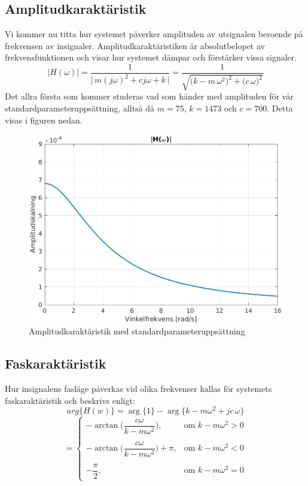 \subsection{Amplitudkaraktäristik}
Vi kommer nu titta hur systemet påverker amplituden av utsignalen beroende på frekvensen av insignaler. Amplitudkaraktäristiken är absolutbelopet av frekvensfunktionen och visar hur systemet dämpar och förstärker vissa signaler. 
$$\big|H(\omega)\big|=\dfrac{1}{\big|\,m(j\omega)^2+cj\omega+k\,\big|}=\dfrac{1}{\sqrt{\big(k-m\,\omega^2\big)^2+\big(c\,\omega\big)^2}}$$
Det allra första som kommer studeras vad som händer med amplituden för vår standardparameteruppsättning, alltså då $m=75$, $k=1473$ och $c=700$. Detta visas i figuren nedan.
\begin{figure}[H]
    \centering
    \includegraphics[scale=0.9]{bilder/amplitudkaraktaristik}
    \caption{Amplitudkaraktäristik med standardparameteruppsättning}
    \label{fig:amplitudkaraktaristik}
\end{figure}



\subsection{Faskaraktäristik}
Hur insignalens fasläge påverkas vid olika frekvenser kallas för systemets faskaraktäristik och beskrivs enligt:
$$arg\big\{H(w)\big\}=\arg\big\{1\big\}-\arg\big\{k-m\omega^2+jc\,\omega\big\}$$
$$=\begin{cases}
-\arctan\bigg(\dfrac{c\omega}{k-m\omega^2}\bigg), & \text{om } k-m\omega^2 > 0  \\\\
-\arctan\bigg(\dfrac{c\omega}{k-m\omega^2}\bigg)+\pi, & \text{om } k-m\omega^2 < 0 \\\\ 
-\dfrac{\pi}{2}, & \text{om } k-m\omega^2 = 0 
\end{cases}$$

